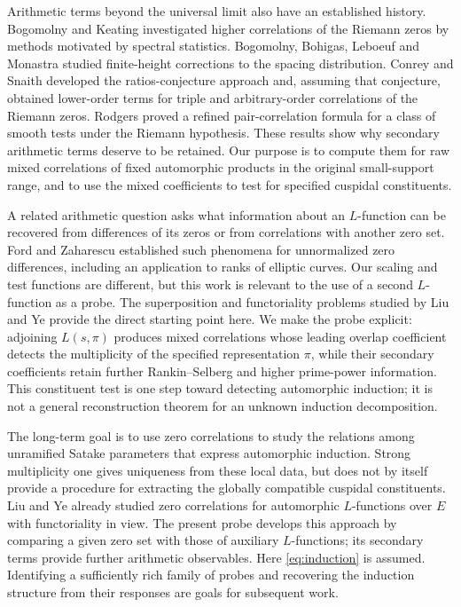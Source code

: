 \documentclass[11pt]{article}
\numberwithin{equation}{section}
\theoremstyle{remark}
\begin{document}
Arithmetic terms beyond the universal limit also have an established
history.  Bogomolny and Keating \cite{BK95,BK96} investigated higher
correlations of the Riemann zeros by methods motivated by spectral
statistics.  Bogomolny, Bohigas, Leboeuf and Monastra \cite{BBLM} studied
finite-height corrections to the spacing distribution.  Conrey and Snaith
\cite{CS,CStriple,CSn} developed the ratios-conjecture approach and, assuming
that conjecture, obtained lower-order terms for triple and arbitrary-order
correlations of the Riemann zeros.  Rodgers \cite{Rodgers} proved a refined
pair-correlation formula for a class of smooth tests under the Riemann
hypothesis.  These results show why secondary arithmetic terms deserve to
be retained.  Our purpose is to compute them for raw mixed correlations of
fixed automorphic products in the original small-support range, and to use
the mixed coefficients to test for specified cuspidal constituents.

A related arithmetic question asks what information about an $L$-function
can be recovered from differences of its zeros or from correlations with
another zero set.  Ford and Zaharescu \cite{FZ} established such phenomena
for unnormalized zero differences, including an application to ranks of
elliptic curves.  Our scaling and test functions are different, but this
work is relevant to the use of a second $L$-function as a probe.
The superposition and functoriality problems studied by Liu and Ye
\cite{LY02,LY08,LY09} provide the direct starting point here.  We make the
probe explicit: adjoining $L(s,\pi)$ produces mixed correlations whose
leading overlap coefficient detects the multiplicity of the specified
representation $\pi$, while their secondary coefficients retain further
Rankin--Selberg and higher prime-power information.  This constituent test
is one step toward detecting automorphic induction; it is not a general
reconstruction theorem for an unknown induction decomposition.


The long-term goal is to use zero correlations to study the relations
among unramified Satake parameters that express automorphic induction.
Strong multiplicity one gives uniqueness from these local data, but
does not by itself provide a procedure for extracting the globally
compatible cuspidal constituents. Liu and Ye \cite{LY09} already
studied zero correlations for automorphic $L$-functions over $E$
with functoriality in view. The present probe develops this approach
by comparing a given zero set with those of auxiliary $L$-functions;
its secondary terms provide further arithmetic observables. Here
\eqref{eq:induction} is assumed. Identifying a sufficiently rich
family of probes and recovering the induction structure from their
responses are goals for subsequent work.
\end{document}
